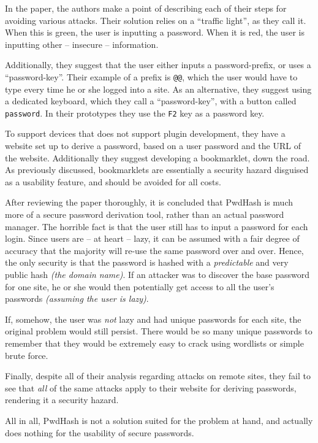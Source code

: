 			In the paper, the authors make a point of describing each of their steps for avoiding various attacks. Their solution relies on a ``traffic light'', as they call it. When this is green, the user is inputting a password. When it is red, the user is inputting other -- insecure -- information. 

			Additionally, they suggest that the user either inputs a password-prefix, or uses a ``password-key''. Their example of a prefix is \verb=@@=, which the user would have to type every time he or she logged into a site. As an alternative, they suggest using a dedicated keyboard, which they call a ``password-key'', with a button called \verb=password=. In their prototypes they use the \verb=F2= key as a password key.

			To support devices that does not support plugin development, they have a website set up to derive a password, based on a user password and the URL of the website. Additionally they suggest developing a bookmarklet, down the road. As previously discussed, bookmarklets are essentially a security hazard disguised as a usability feature, and should be avoided for all costs.


			After reviewing the paper thoroughly, it is concluded that PwdHash is much more of a secure password derivation tool, rather than an actual password manager. The horrible fact is that the user still has to input a password for each login. Since users are -- at heart -- lazy, it can be assumed with a fair degree of accuracy that the majority will re-use the same password over and over. Hence, the only security is that the password is hashed with a \emph{predictable} and very public hash \emph{(the domain name)}. If an attacker was to discover the base password for one site, he or she would then potentially get access to all the user's passwords \emph{(assuming the user is lazy)}.

			If, somehow, the user was \emph{not} lazy and had unique passwords for each site, the original problem would still persist. There would be so many unique passwords to remember that they would be extremely easy to crack using wordlists or simple brute force.

			Finally, despite all of their analysis regarding attacks on remote sites, they fail to see that \emph{all} of the same attacks apply to their website for deriving passwords, rendering it a security hazard.

			All in all, PwdHash is not a solution suited for the problem at hand, and actually does nothing for the usability of secure passwords.

